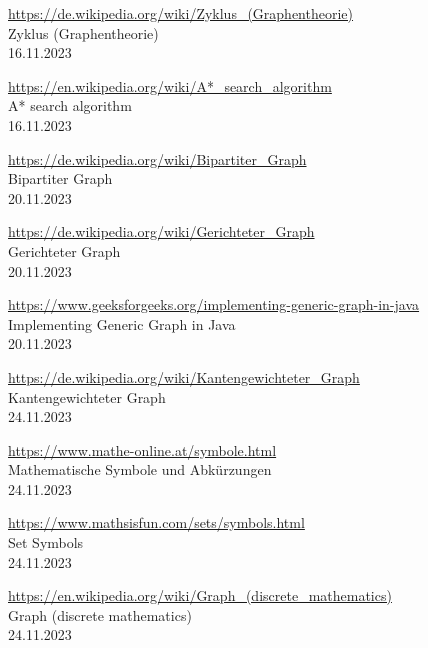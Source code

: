 \begin{thebibliography}{999}
    \href{https://de.wikipedia.org/wiki/Zyklus_(Graphentheorie)}{https://de.wikipedia.org/wiki/Zyklus\_(Graphentheorie)}\\
    Zyklus (Graphentheorie)\\
    16.11.2023
    
    \href{https://en.wikipedia.org/wiki/A*_search_algorithm}{https://en.wikipedia.org/wiki/A*\_search\_algorithm}\\
    A* search algorithm\\
    16.11.2023
    
    \href{https://de.wikipedia.org/wiki/Bipartiter_Graph}{https://de.wikipedia.org/wiki/Bipartiter\_Graph}\\
    Bipartiter Graph\\
    20.11.2023
    
    \href{https://de.wikipedia.org/wiki/Gerichteter_Graph}{https://de.wikipedia.org/wiki/Gerichteter\_Graph}\\
    Gerichteter Graph\\
    20.11.2023
    
    \href{https://www.geeksforgeeks.org/implementing-generic-graph-in-java}{https://www.geeksforgeeks.org/implementing-generic-graph-in-java}\\
    Implementing Generic Graph in Java\\
    20.11.2023
    
    \href{https://de.wikipedia.org/wiki/Kantengewichteter_Graph}{https://de.wikipedia.org/wiki/Kantengewichteter\_Graph}\\
    Kantengewichteter Graph\\
    24.11.2023
    
    \href{https://www.mathe-online.at/symbole.html}{https://www.mathe-online.at/symbole.html}\\
    Mathematische Symbole und Abkürzungen\\
    24.11.2023

    \href{https://www.mathsisfun.com/sets/symbols.html}{https://www.mathsisfun.com/sets/symbols.html}\\
    Set Symbols\\
    24.11.2023

    \href{https://en.wikipedia.org/wiki/Graph_(discrete_mathematics)}{https://en.wikipedia.org/wiki/Graph\_(discrete\_mathematics)}\\
    Graph (discrete mathematics)\\
    24.11.2023


\end{thebibliography}
